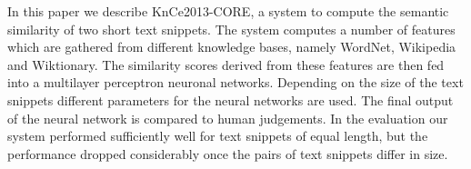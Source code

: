 In this paper we describe KnCe2013-CORE, a system to compute the semantic similarity of two short text snippets.
 The system computes a number of features which are gathered from different
 knowledge bases, namely WordNet, Wikipedia and Wiktionary.
 The similarity scores derived from these features are then fed into a
 multilayer perceptron neuronal networks.
 Depending on the size of the text snippets different parameters for the neural
 networks are used.
 The final output of the neural network is compared to human judgements.
 In the evaluation our system performed sufficiently well for text snippets of
 equal length, but the performance dropped considerably once the pairs of text
 snippets differ in size.

